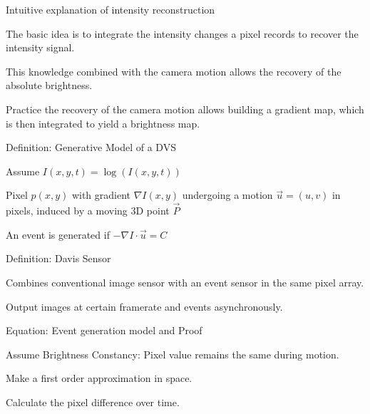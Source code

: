 \documentclass[10pt,a4paper]{scrartcl}
\begin{document}
\begin{multicols*}{2}
\begin{QandA}
{Intuitive explanation of intensity reconstruction}
\item The basic idea is to integrate the intensity changes a pixel records to recover the intensity signal.
\item This knowledge combined with the camera motion allows the recovery of the absolute brightness.
\item Practice the recovery of the camera motion allows building a gradient map, which is then integrated to yield a brightness map.
\end{QandA}

\begin{QandA}
{Definition: Generative Model of a DVS}
\item Assume $I(x,y,t)=\log(I(x,y,t))$
\item Pixel $p(x,y)$ with gradient $\nabla I(x,y)$ undergoing a motion $\vec{u}=(u,v)$ in pixels, induced by a moving 3D point $\vec{P}$
\item An event is generated if $-\nabla I\cdot\vec{u}=C$
\end{QandA}

\begin{QandA}
{Definition: Davis Sensor}
\item Combines conventional image sensor with an event sensor in the same pixel array.
\item Output images at certain framerate and events asynchronously.
\end{QandA}

\begin{QandA}
{Equation: Event generation model and Proof}
\item Assume Brightness Constancy: Pixel value remains the same during motion.
\item Make a first order approximation in space.
\item Calculate the pixel difference over time.
\end{QandA}

\end{multicols*}
\end{document}
